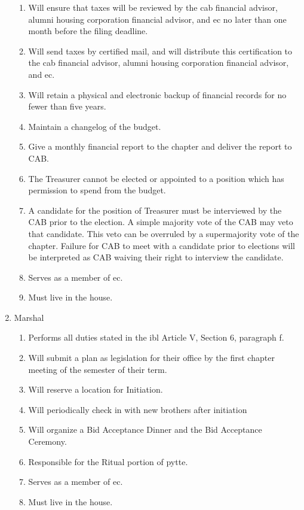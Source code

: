 \begin{enumerate}
\begin{enumerate}
				\item Will ensure that taxes will be reviewed by the \gls{cab} financial advisor, alumni housing corporation financial advisor, and \gls{ec} no later than one month before the filing deadline.
				\item Will send taxes by certified mail, and will distribute this certification to the \gls{cab} financial advisor, alumni housing corporation financial advisor, and \gls{ec}.
				\item Will retain a physical and electronic backup of financial records for no fewer than five years.
                \item Maintain a changelog of the budget.
                \item Give a monthly financial report to the chapter and deliver the report to CAB.
                \item The Treasurer cannot be elected or appointed to a position which has permission
to spend from the budget.
				\item A candidate for the position of Treasurer must be interviewed by the CAB prior to the
election. A simple majority vote of the CAB may veto that candidate. This veto can be overruled
by a supermajority vote of the chapter. Failure for CAB to meet with a candidate prior to
elections will be interpreted as CAB waiving their right to interview the candidate.
				\item Serves as a member of \gls{ec}.
				\item Must live in the house.
			\end{enumerate}
		
		\item Marshal
			\begin{enumerate}
				\item Performs all duties stated in the \gls{ibl} Article V, Section 6, paragraph f.
				\item Will submit a plan as legislation for their office by the first chapter meeting of the semester of their term.
				\item Will reserve a location for Initiation.
				\item Will periodically check in with new brothers after initiation
                		\item Will organize a Bid Acceptance Dinner and the Bid Acceptance Ceremony.
				\item Responsible for the Ritual portion of \gls{pytte}.
				\item Serves as a member of \gls{ec}.
				\item Must live in the house.
			\end{enumerate}


\end{enumerate}
